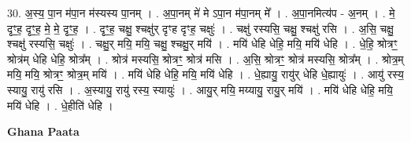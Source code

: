 \documentclass[17pt]{extarticle}
\begin{document}
30. अ॒स्य॒ पा॒न म॑पा॒न म॑स्यस्य पा॒नम् । . अ॒पा॒नम् मे॑ मे ऽपा॒न म॑पा॒नम् मे᳚ । . अ॒पा॒नमित्य॑प - अ॒नम् । . मे॒ दृꣳ॒॒ह॒ दृꣳ॒॒ह॒ मे॒ मे॒ दृꣳ॒॒ह॒ । . दृꣳ॒॒ह॒ चक्षु॒ श्चक्षु॑र् दृꣳह दृꣳह॒ चक्षुः॑ । . चक्षु॑ रस्यसि॒ चक्षु॒ श्चक्षु॑ रसि । . अ॒सि॒ चक्षु॒ श्चक्षु॑ रस्यसि॒ चक्षुः॑ । . चक्षु॒र् मयि॒ मयि॒ चक्षु॒ श्चक्षु॒र् मयि॑ । . मयि॑ धेहि धेहि॒ मयि॒ मयि॑ धेहि । . धे॒हि॒ श्रोत्रꣳ॒॒ श्रोत्र॑म् धेहि धेहि॒ श्रोत्र᳚म् । . श्रोत्र॑ मस्यसि॒ श्रोत्रꣳ॒॒ श्रोत्र॑ मसि । . अ॒सि॒ श्रोत्रꣳ॒॒ श्रोत्र॑ मस्यसि॒ श्रोत्र᳚म् । . श्रोत्र॒म् मयि॒ मयि॒ श्रोत्रꣳ॒॒ श्रोत्र॒म् मयि॑ । . मयि॑ धेहि धेहि॒ मयि॒ मयि॑ धेहि । . धे॒ह्यायु॒ रायु॑र् धेहि धे॒ह्यायुः॑ । . आयु॑ रस्य॒ स्यायु॒ रायु॑ रसि । . अ॒स्यायु॒ रायु॑ रस्य॒ स्यायुः॑ । . आयु॒र् मयि॒ मय्यायु॒ रायु॒र् मयि॑ । . मयि॑ धेहि धेहि॒ मयि॒ मयि॑ धेहि । . धे॒हीति॑ धेहि । \newline

\textbf{Ghana Paata } \newline
\end{document}
